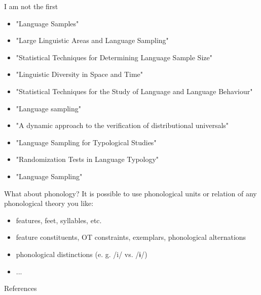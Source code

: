 \documentclass[13pt, t]{beamer}
\begin{document}
\begin{frame}{I am not the first}
\begin{itemize}
\item \citep{bell78} "Language Samples"
\item \citep{dryer89} "Large Linguistic Areas and Language Sampling"
\item \citep{perkins89} "Statistical Techniques for Determining Language Sample Size"
\item \citep{nichols92} "Linguistic Diversity in Space and Time"
\item \citep{rietveld93} "Statistical Techniques for the Study of Language and Language Behaviour"
\item \citep{rijkhoff98} "Language sampling"
\item \citep{maslova00} "A dynamic approach to the verification of distributional universals"
\item \citep{widmann01} "Language Sampling for Typological Studies"
\item \citep{janssen06} "Randomization Tests in Language Typology"
\item \citep{bakker10} "Language Sampling"
\end{itemize}
\end{frame}

\begin{frame}{What about phonology?}
It is possible to use phonological units or relation of any phonological theory you like:
\begin{itemize}
\item features, feet, syllables, etc.
\item feature constituents, OT constraints, exemplars, phonological alternations
\item phonological distinctions (e. g. /i/ vs. /ɨ/)
\item ...
\end{itemize}
\end{frame}


\begin{frame}{References}
\footnotesize


\end{frame}
\end{document}
